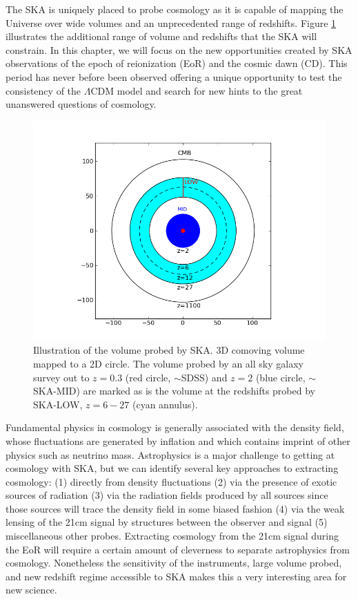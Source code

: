 \documentclass{PoS}
\begin{document}
The SKA is uniquely placed to probe cosmology as it is capable of mapping the Universe over wide volumes and an unprecedented range of redshifts. Figure \ref{fig:volume} illustrates the additional range of volume and redshifts that the SKA will constrain. In this chapter, we will focus on the new opportunities created by SKA observations of the epoch of reionization (EoR) and the cosmic dawn (CD). This period has never before been observed offering a unique opportunity to test the consistency of the $\Lambda$CDM model and search for new hints to the great unanswered questions of cosmology.

\begin{figure}[htbp]
\begin{center}
\includegraphics[scale=0.6]{figures/volumecirc.png}
\caption{Illustration of the volume probed by SKA. 3D comoving volume mapped to a 2D circle. The volume probed by an all sky galaxy survey out to $z=0.3$ (red circle, $\sim$SDSS) and $z=2$ (blue circle, $\sim$SKA-MID) are marked as is the volume at the redshifts probed by SKA-LOW, $z=6-27$ (cyan annulus).}
\label{fig:volume}
\end{center}
\end{figure}

Fundamental physics in cosmology is generally associated with the density field, whose fluctuations are generated by inflation and which contains imprint of other physics such as neutrino mass. Astrophysics is a major challenge to getting at cosmology with SKA, but we can identify several key approaches to extracting cosmology: (1) directly from density fluctuations (2) via the presence of exotic sources of radiation (3) via the radiation fields produced by all sources since those sources will trace the density field in some biased fashion (4) via the weak lensing of the 21cm signal by structures between the observer and signal (5) miscellaneous other probes. Extracting cosmology from the 21cm signal during the EoR will require a certain amount of cleverness to separate astrophysics from cosmology. Nonetheless the sensitivity of the instruments, large volume probed, and new redshift regime accessible to SKA makes this a very interesting area for new science. 
\end{document}
